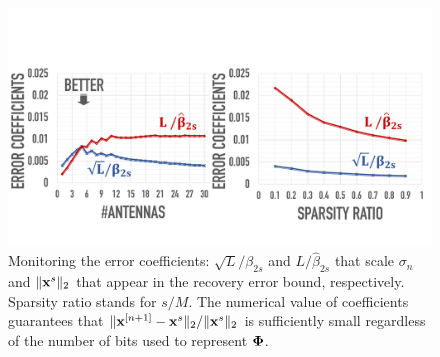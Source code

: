 \documentclass{article}
\begin{document}
\begin{figure}[t!]
\centering
\includegraphics[width=1\columnwidth, angle=0]{figs/beta.pdf}
\caption{Monitoring the error coefficients: $\sqrt{L}/\beta_{2s}$ and $L/\hat{\beta}_{2s}$ that scale $ \sigma_n$ and $\|{\bf x}^s \|_2$ that appear in the recovery error bound, respectively. Sparsity ratio stands for $s/M$. The numerical value of coefficients guarantees that $\|{\bf x}^{[n+1]}-{\bf x}^s\|_2/\|{\bf x}^s \|_2$ is sufficiently small regardless of the number of bits used to represent ${\bf \Phi}$.}
\label{fig:beta}
\end{figure}
\vspace{-.1em}
\end{document}
